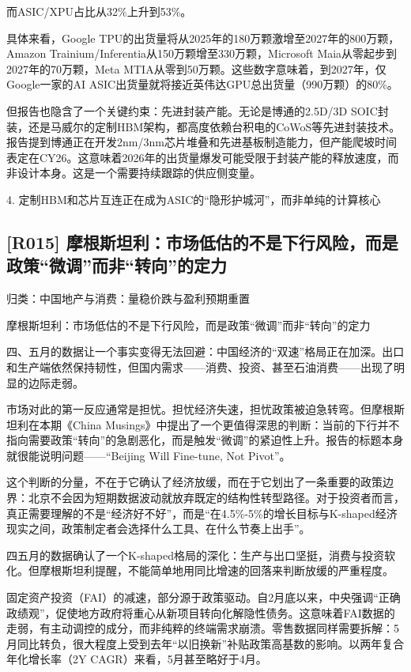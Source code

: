 \documentclass[11pt]{ctexart}
\begin{document}
而ASIC/XPU占比从32\%上升到53\%。

具体来看，Google TPU的出货量将从2025年的180万颗激增至2027年的800万颗，Amazon Trainium/Inferentia从150万颗增至330万颗，Microsoft Maia从零起步到2027年的70万颗，Meta MTIA从零到50万颗。这些数字意味着，到2027年，仅Google一家的AI ASIC出货量就将接近英伟达GPU总出货量（990万颗）的80\%。

但报告也隐含了一个关键约束：先进封装产能。无论是博通的2.5D/3D SOIC封装，还是马威尔的定制HBM架构，都高度依赖台积电的CoWoS等先进封装技术。报告提到博通正在开发2nm/3nm芯片堆叠和先进基板制造能力，但产能爬坡时间表定在CY26。这意味着2026年的出货量爆发可能受限于封装产能的释放速度，而非设计本身。这是一个需要持续跟踪的供应侧变量。

4. 定制HBM和芯片互连正在成为ASIC的“隐形护城河”，而非单纯的计算核心

\subsection{[R015] 摩根斯坦利：市场低估的不是下行风险，而是政策“微调”而非“转向”的定力}
{\small\color{refgray}归类：中国地产与消费：量稳价跌与盈利预期重置}

摩根斯坦利：市场低估的不是下行风险，而是政策“微调”而非“转向”的定力

四、五月的数据让一个事实变得无法回避：中国经济的“双速”格局正在加深。出口和生产端依然保持韧性，但国内需求——消费、投资、甚至石油消费——出现了明显的边际走弱。

市场对此的第一反应通常是担忧。担忧经济失速，担忧政策被迫急转弯。但摩根斯坦利在本期《China Musings》中提出了一个更值得深思的判断：当前的下行并不指向需要政策“转向”的急剧恶化，而是触发“微调”的紧迫性上升。报告的标题本身就很能说明问题——“Beijing Will Fine-tune, Not Pivot”。

这个判断的分量，不在于它确认了经济放缓，而在于它划出了一条重要的政策边界：北京不会因为短期数据波动就放弃既定的结构性转型路径。对于投资者而言，真正需要理解的不是“经济好不好”，而是“在4.5\%-5\%的增长目标与K-shaped经济现实之间，政策制定者会选择什么工具、在什么节奏上出手”。

四五月的数据确认了一个K-shaped格局的深化：生产与出口坚挺，消费与投资软化。但摩根斯坦利提醒，不能简单地用同比增速的回落来判断放缓的严重程度。

固定资产投资（FAI）的减速，部分源于政策驱动。自2月底以来，中央强调“正确政绩观”，促使地方政府将重心从新项目转向化解隐性债务。这意味着FAI数据的走弱，有主动调控的成分，而非纯粹的终端需求崩溃。零售数据同样需要拆解：5月同比转负，很大程度上受到去年“以旧换新”补贴政策高基数的影响。以两年复合年化增长率（2Y CAGR）来看，5月甚至略好于4月。
\end{document}
